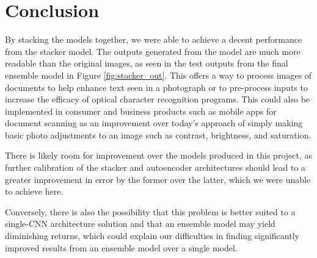 \documentclass[10pt,twocolumn,letterpaper]{article}
\begin{document}
\section{Conclusion}

By stacking the models together, we were able to achieve a decent performance from the stacker model. The outputs generated from the model are much more readable than the original images, as seen in the test outputs from the final ensemble model in Figure \ref{fig:stacker_out}. This offers a way to process images of documents to help enhance text seen in a photograph or to pre-process inputs to increase the efficacy of optical character recognition programs. This could also be implemented in consumer and business products such as mobile apps for document scanning as an improvement over today's approach of simply making basic photo adjustments to an image such as contrast, brightness, and saturation.

There is likely room for improvement over the models produced in this project, as further calibration of the stacker and autoencoder architectures should lead to a greater improvement in error by the former over the latter, which we were unable to achieve here.

Conversely, there is also the possibility that this problem is better suited to a single-CNN architecture solution and that an ensemble model may yield diminishing returns, which could explain our difficulties in finding significantly improved results from an ensemble model over a single model.




{\small


}
\end{document}
